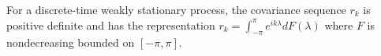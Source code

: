 For a discrete-time weakly stationary process, the covariance sequence $r_k$ is positive definite and has the representation $r_k = \int_{-\pi}^\pi e^{ik\lambda} dF(\lambda)$ where $F$ is nondecreasing bounded on $[-\pi, \pi]$.
